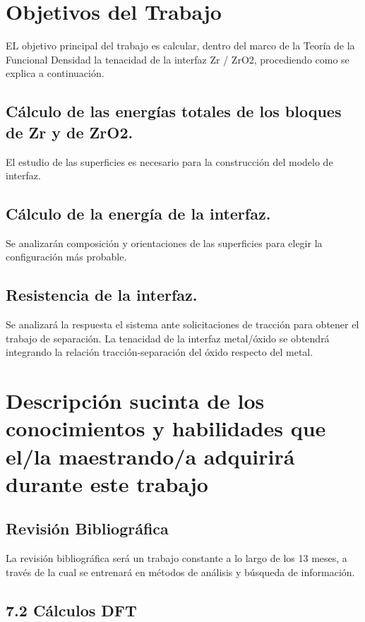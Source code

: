 \section{Objetivos del Trabajo}

EL objetivo principal del trabajo es calcular, dentro del marco de la Teoría de 
la Funcional Densidad la tenacidad de la interfaz Zr / ZrO2, procediendo como
se explica a continuación.

\subsection{ Cálculo de las energías totales de los bloques de Zr y de ZrO2.}

El estudio de las superficies es necesario para la construcción del modelo de 
interfaz.

\subsection{ Cálculo de la energía de la interfaz.}

Se analizarán composición y orientaciones de las superficies para elegir la 
configuración más probable.

\subsection{Resistencia de la interfaz.}

 Se analizará la respuesta el sistema ante solicitaciones de tracción para 
obtener el trabajo de separación. La tenacidad de la interfaz metal/óxido se 
obtendrá integrando la relación tracción-separación del óxido respecto del 
metal.

\section{Descripción sucinta de los conocimientos y habilidades que el/la 
maestrando/a adquirirá durante este trabajo }

\subsection{ Revisión Bibliográfica}

La revisión bibliográfica será un trabajo constante a lo largo de los 13 meses, 
a través de la cual se entrenará en métodos de análisis y búsqueda de 
información.

\subsection{7.2  Cálculos DFT}

